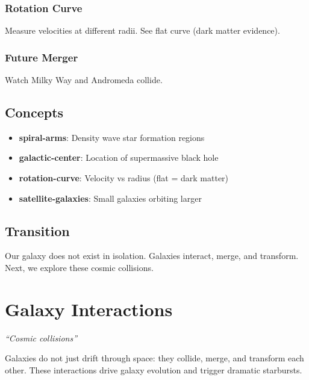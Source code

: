 \documentclass[
  11pt,
  letterpaper,
  twoside,
  openright]{book}
\providecommand{\tightlist}{%
  \setlength{\itemsep}{0pt}\setlength{\parskip}{0pt}}
\begin{document}
\subsection{Rotation Curve}\label{rotation-curve}

Measure velocities at different radii. See flat curve (dark matter
evidence).

\subsection{Future Merger}\label{future-merger}

Watch Milky Way and Andromeda collide.

\section{Concepts}\label{concepts-26}

\begin{itemize}
\tightlist
\item
  \textbf{spiral-arms}: Density wave star formation regions
\item
  \textbf{galactic-center}: Location of supermassive black hole
\item
  \textbf{rotation-curve}: Velocity vs radius (flat = dark matter)
\item
  \textbf{satellite-galaxies}: Small galaxies orbiting larger
\end{itemize}

\section{Transition}\label{transition-26}

Our galaxy does not exist in isolation. Galaxies interact, merge, and
transform. Next, we explore these cosmic collisions.

\chapter{Galaxy Interactions}\label{sec-galaxy-interactions}

\emph{``Cosmic collisions''}

\begin{tcolorbox}[enhanced jigsaw, coltitle=black, colbacktitle=quarto-callout-note-color!10!white, toprule=.15mm, colframe=quarto-callout-note-color-frame, arc=.35mm, opacityback=0, bottomtitle=1mm, toptitle=1mm, breakable, colback=white, titlerule=0mm, opacitybacktitle=0.6, title=\textcolor{quarto-callout-note-color}{\faInfo}\hspace{0.5em}{Key Revelation}, rightrule=.15mm, bottomrule=.15mm, leftrule=.75mm, left=2mm]

Galaxies do not just drift through space: they collide, merge, and
transform each other. These interactions drive galaxy evolution and
trigger dramatic starbursts.

\end{tcolorbox}
\end{document}
